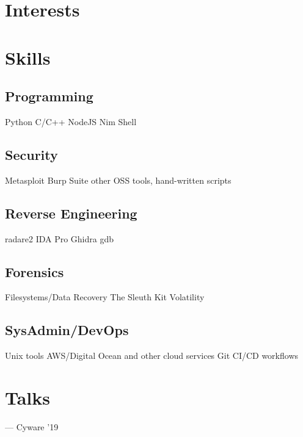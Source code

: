 \documentclass[]{resume-openfont}
\begin{document}
\begin{minipage}[t]{0.33\textwidth}
\section{Interests}
\sectionsep


\vspace{-2mm} %

\section{Skills}
\subsection{Programming}
Python \textbullet{} C/C++ \textbullet{} NodeJS \textbullet{} Nim \textbullet{} Shell
\sectionsep
\subsection{Security}
Metasploit \textbullet{} Burp Suite \textbullet{} other OSS tools, hand-written scripts
\sectionsep
\subsection{Reverse Engineering}
radare2 \textbullet{} IDA Pro \textbullet{} Ghidra \textbullet{} gdb
\sectionsep
\subsection{Forensics}
Filesystems/Data Recovery \textbullet{} The Sleuth Kit \textbullet{} Volatility
\sectionsep
\subsection{SysAdmin/DevOps}
Unix tools \textbullet{} AWS/Digital Ocean and other cloud services \textbullet{} Git \textbullet{} CI/CD workflows


\vspace{4mm} %
\section{Talks}
\href{https://github.com/icyphox/cyware19/raw/master/slides/Cyware RE Workshop.pdf}{\bf{}} — Cyware '19
%
%

\end{minipage} 
\end{document}
